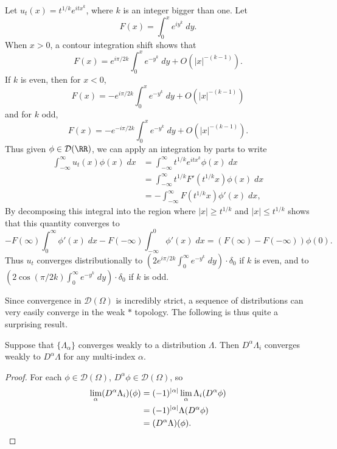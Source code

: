 \begin{example}
    Let $u_t(x) = t^{1/k} e^{itx^k}$, where $k$ is an integer bigger than one. Let
    \[ F(x) = \int_0^x e^{iy^k}\; dy. \]
    When $x > 0$, a contour integration shift shows that
    \[ F(x) = e^{i \pi / 2k} \int_0^x e^{-y^k}\; dy + O(|x|^{-(k-1)}). \]
    If $k$ is even, then for $x < 0$,
    \[ F(x) = - e^{i \pi / 2k} \int_0^x e^{-y^k}\; dy + O(|x|^{-(k-1)}) \]
    and for $k$ odd,
    \[ F(x) = - e^{-i \pi / 2k} \int_0^x e^{-y^k}\; dy + O(|x|^{-(k-1)}). \]
    Thus given $\phi \in \mathcal{D}(\RR)$, we can apply an integration by parts to write
    \begin{align*}
        \int_{-\infty}^\infty u_t(x) \phi(x)\; dx &= \int_{-\infty}^\infty t^{1/k} e^{itx^k} \phi(x)\; dx \\
        &= \int_{-\infty}^\infty t^{1/k} F'(t^{1/k} x) \phi(x)\; dx\\
        &= - \int_{-\infty}^\infty F(t^{1/k} x) \phi'(x)\; dx,
     \end{align*}
     By decomposing this integral into the region where $|x| \geq t^{1/k}$ and $|x| \leq t^{1/k}$ shows that this quantity converges to
     \[ - F(\infty) \int_0^\infty \phi'(x)\; dx - F(-\infty) \int_{-\infty}^0 \phi'(x)\; dx = (F(\infty) - F(-\infty)) \phi(0). \]
     Thus $u_t$ converges distributionally to $\left( 2 e^{i \pi / 2k} \int_0^\infty e^{-y^k}\; dy \right) \cdot \delta_0$ if $k$ is even, and to $\left( 2 \cos(\pi / 2k) \int_0^\infty e^{-y^k}\; dy \right) \cdot \delta_0$ if $k$ is odd.
\end{example}

Since convergence in $\mathcal{D}(\Omega)$ is incredibly strict, a sequence of distributions can very easily converge in the weak $*$ topology. The following is thus quite a surprising result.

\begin{theorem}
  Suppose that $\{ \Lambda_\alpha \}$ converges weakly to a distribution $\Lambda$. Then $D^\alpha \Lambda_i$ converges weakly to $D^\alpha \Lambda$ for any multi-index $\alpha$.
\end{theorem}
\begin{proof}
  For each $\phi \in \mathcal{D}(\Omega)$, $D^\alpha \phi \in \mathcal{D}(\Omega)$, so
  \begin{align*}
    \lim_\alpha (D^\alpha \Lambda_i)(\phi) &= (-1)^{|\alpha|} \lim_\alpha \Lambda_i(D^\alpha \phi)\\
    &= (-1)^{|\alpha|} \Lambda(D^\alpha \phi)\\
    &= (D^\alpha \Lambda)(\phi). \qedhere
  \end{align*}
\end{proof}

